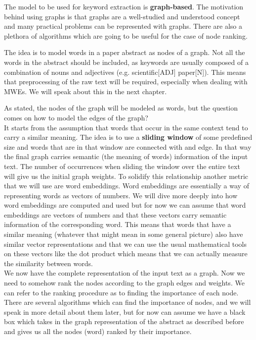 \documentclass[12pt]{article}
\numberwithin{equation}{section}
\begin{document}
\begin{spacing}{1.5}
	The model to be used for keyword extraction is \textbf{graph-based}. The motivation behind using graphs is that graphs are a well-studied and understood concept and many practical problems can be represented with graphs. There are also a plethora of algorithms which are going to be useful for the case of node ranking.
	
	The idea is to model words in a paper abstract as nodes of a graph. Not all the words in the abstract should be included, as keywords are usually composed of a combination of nouns and adjectives (e.g. scientific[ADJ] paper[N]). This means that preprocessing of the raw text will be required, especially when dealing with MWEs. We will speak about this in the next chapter.
	
	As stated, the nodes of the graph will be modeled as words, but the question comes on how to model the edges of the graph? \\
	It starts from the assumption that words that occur in the same context tend to carry a similar meaning. The idea is to use a \textbf{sliding window} of some predefined size and words that are in that window are connected with and edge. In that way the final graph carries semantic (the meaning of words) information of the input text. The number of occurrences when sliding the window over the entire text will give us the initial graph weights. To solidify this relationship another metric that we will use are word embeddings. Word embeddings are essentially a way of representing words as vectors of numbers. We will dive more deeply into how word embeddings are computed and used but for now we can assume that word embeddings are vectors of numbers and that these vectors carry semantic information of the corresponding word. This means that words that have a similar meaning (whatever that might mean in some general picture) also have similar vector representations and that we can use the usual mathematical tools on these vectors like the dot product which means that we can actually measure the similarity between words. \\
	We now have the complete representation of the input text as a graph. Now we need to somehow rank the nodes according to the graph edges and weights. We can refer to the ranking procedure as to finding the importance of each node. There are several algorithms which can find the importance of nodes, and we will speak in more detail about them later, but for now can assume we have a black box which takes in the graph representation of the abstract as described before and gives us all the nodes (word) ranked by their importance. \\

\end{spacing}
\end{document}
